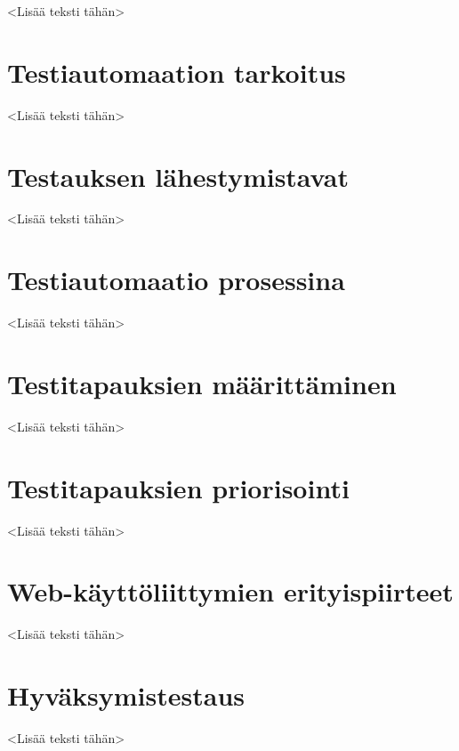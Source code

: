 <Lisää teksti tähän>

\section{Testiautomaation tarkoitus}

<Lisää teksti tähän>

\section{Testauksen lähestymistavat}

<Lisää teksti tähän>

\section{Testiautomaatio prosessina}

<Lisää teksti tähän>

\section{Testitapauksien määrittäminen}

<Lisää teksti tähän>

\section{Testitapauksien priorisointi}

<Lisää teksti tähän>

\section{Web-käyttöliittymien erityispiirteet}

<Lisää teksti tähän>

\section{Hyväksymistestaus}

<Lisää teksti tähän>
